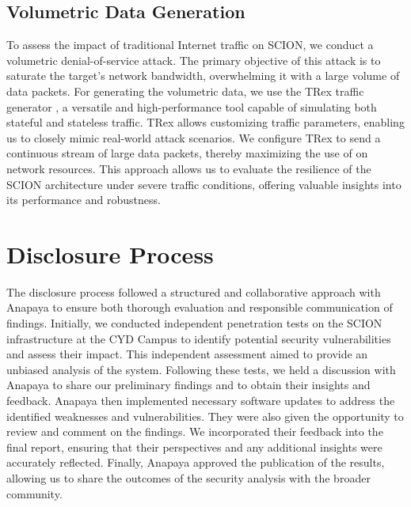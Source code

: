 \subsection{Volumetric Data Generation}
To assess the impact of traditional Internet traffic on SCION, we conduct a volumetric denial-of-service attack.
The primary objective of this attack is to saturate the target's network bandwidth, overwhelming it with a large volume of data packets.
For generating the volumetric data, we use the TRex traffic generator \cite{trexWebsite}, a versatile and high-performance tool capable of simulating both stateful and stateless traffic.
TRex allows customizing traffic parameters, enabling us to closely mimic real-world attack scenarios.
We configure TRex to send a continuous stream of large data packets, thereby maximizing the use of on network resources.
This approach allows us to evaluate the resilience of the SCION architecture under severe traffic conditions, offering valuable insights into its performance and robustness.

\section{Disclosure Process}
\label{sec:methodology:disclosure}

The disclosure process followed a structured and collaborative approach with Anapaya to ensure both thorough evaluation and responsible communication of findings.
Initially, we conducted independent penetration tests on the SCION infrastructure at the CYD Campus to identify potential security vulnerabilities and assess their impact.
This independent assessment aimed to provide an unbiased analysis of the system.
Following these tests, we held a discussion with Anapaya to share our preliminary findings and to obtain their insights and feedback.
Anapaya then implemented necessary software updates to address the identified weaknesses and vulnerabilities.
They were also given the opportunity to review and comment on the findings.
We incorporated their feedback into the final report, ensuring that their perspectives and any additional insights were accurately reflected.
Finally, Anapaya approved the publication of the results, allowing us to share the outcomes of the security analysis with the broader community.

